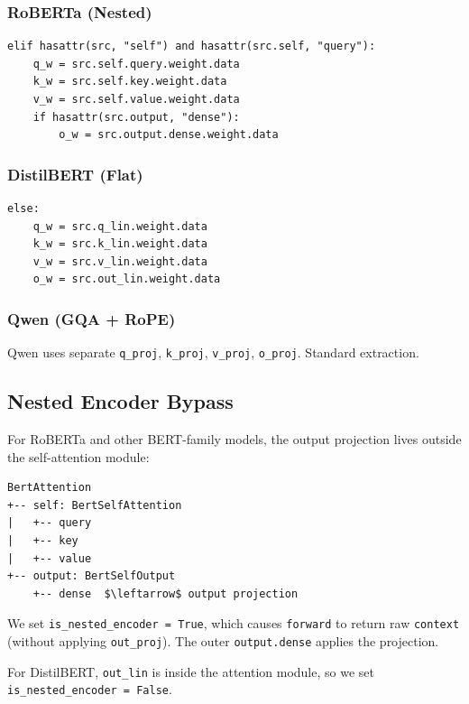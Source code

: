 \subsubsection{RoBERTa (Nested)}

\begin{lstlisting}
elif hasattr(src, "self") and hasattr(src.self, "query"):
    q_w = src.self.query.weight.data
    k_w = src.self.key.weight.data
    v_w = src.self.value.weight.data
    if hasattr(src.output, "dense"):
        o_w = src.output.dense.weight.data
\end{lstlisting}

\subsubsection{DistilBERT (Flat)}

\begin{lstlisting}
else:
    q_w = src.q_lin.weight.data
    k_w = src.k_lin.weight.data
    v_w = src.v_lin.weight.data
    o_w = src.out_lin.weight.data
\end{lstlisting}

\subsubsection{Qwen (GQA + RoPE)}

Qwen uses separate \texttt{q\_proj}, \texttt{k\_proj}, \texttt{v\_proj}, \texttt{o\_proj}. Standard extraction.

\subsection{Nested Encoder Bypass}

For RoBERTa and other BERT-family models, the output projection lives 
outside the self-attention module:

\begin{lstlisting}
BertAttention
+-- self: BertSelfAttention
|   +-- query
|   +-- key
|   +-- value
+-- output: BertSelfOutput
    +-- dense  $\leftarrow$ output projection
\end{lstlisting}

We set \texttt{is\_nested\_encoder = True}, which causes \texttt{forward} to return raw 
\texttt{context} (without applying \texttt{out\_proj}). The outer \texttt{output.dense} applies 
the projection.

For DistilBERT, \texttt{out\_lin} is inside the attention module, so we set 
\texttt{is\_nested\_encoder = False}.

